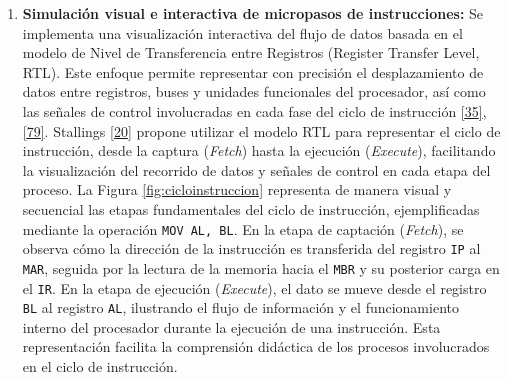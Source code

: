\documentclass[12pt,oneside]{templates/unerthesis}
\providecommand{\tightlist}{%
  \setlength{\itemsep}{0pt}\setlength{\parskip}{0pt}}
\begin{document}
\begin{table}[!h]
\centering
\caption{\label{tab:activacionprogresiva}Activación progresiva del repertorio de instrucciones}
\centering
{}
\end{table}

\begin{enumerate}
\def\labelenumi{\arabic{enumi}.}
\setcounter{enumi}{3}
\tightlist
\item
  \textbf{Simulación visual e interactiva de micropasos de instrucciones:}
  Se implementa una visualización interactiva del flujo de datos basada en el modelo de Nivel de Transferencia entre Registros (Register Transfer Level, RTL). Este enfoque permite representar con precisión el desplazamiento de datos entre registros, buses y unidades funcionales del procesador, así como las señales de control involucradas en cada fase del ciclo de instrucción \protect\hyperlink{ref-harris2015digital}{{[}35{]}}, \protect\hyperlink{ref-ASMVisualizer2025}{{[}79{]}}. Stallings \protect\hyperlink{ref-stallings_computer_2021}{{[}20{]}} propone utilizar el modelo RTL para representar el ciclo de instrucción, desde la captura (\emph{Fetch}) hasta la ejecución (\emph{Execute}), facilitando la visualización del recorrido de datos y señales de control en cada etapa del proceso. La Figura \ref{fig:cicloinstruccion} representa de manera visual y secuencial las etapas fundamentales del ciclo de instrucción, ejemplificadas mediante la operación \texttt{MOV\ AL,\ BL}. En la etapa de captación (\emph{Fetch}), se observa cómo la dirección de la instrucción es transferida del registro \texttt{IP} al \texttt{MAR}, seguida por la lectura de la memoria hacia el \texttt{MBR} y su posterior carga en el \texttt{IR}. En la etapa de ejecución (\emph{Execute}), el dato se mueve desde el registro \texttt{BL} al registro \texttt{AL}, ilustrando el flujo de información y el funcionamiento interno del procesador durante la ejecución de una instrucción. Esta representación facilita la comprensión didáctica de los procesos involucrados en el ciclo de instrucción.
\end{enumerate}
\end{document}
